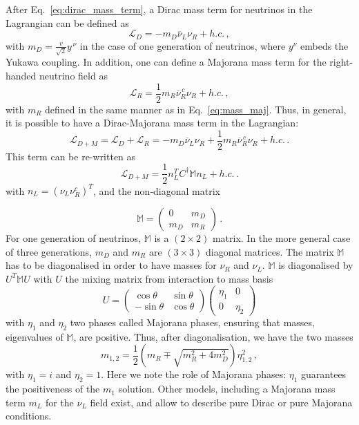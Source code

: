 After Eq.~\eqref{eq:dirac_mass_term}, a Dirac mass term for neutrinos in the Lagrangian can be defined as
\begin{equation}
  \mathcal{L}_D=-m_D\overline{\nu}_L\nu_R+h.c.\,,
  \label{eq:lag_dirac}
\end{equation}
with $m_D=\frac{v}{\sqrt{2}}y^{\,\nu}$ in the case of one generation of neutrinos, where $y^{\nu}$ embeds the Yukawa coupling.
In addition, one can define a Majorana mass term for the right-handed neutrino field as
\begin{equation}
  \mathcal{L}_R=\frac{1}{2}m_R\overline{\nu}_{R}^{\,c}\nu_{R}+h.c.\,,
\end{equation}
with $m_R$ defined in the same manner as in Eq.~\eqref{eq:mass_maj}.
Thus, in general, it is possible to have a Dirac-Majorana mass term in the Lagrangian:
\begin{equation}
\mathcal{L}_{D+M}=\mathcal{L}_D+\mathcal{L}_R=-m_{D}\overline{\nu}_L\nu_R+\frac{1}{2}m_R\overline{\nu}_{R}^{\,c}\nu_{R}+h.c.\,.
\end{equation}
This term can be re-written as
\begin{equation}
  \mathcal{L}_{D+M}=\frac{1}{2}n_L^TC^{\dagger}\mathbb{M}n_L+h.c.\,.
\end{equation}
with $n_L=(\nu_L \nu_R^{c})^{T}$, and the non-diagonal matrix

\begin{equation}
\mathbb{M}=
\begin{pmatrix}
  0 & m_D \\
  m_D & m_{R}
\end{pmatrix}
\,.
\end{equation}
For one generation of neutrinos, $\mathbb{M}$ is a $(2\times 2)$ matrix.
In the more general case of three generations, $m_D$ and $m_R$ are $(3 \times 3)$ diagonal matrices.
The matrix $\mathbb{M}$ has to be diagonalised in order to have masses for $\nu_R$ and $\nu_L$.
$\mathbb{M}$ is diagonalised by $U^T\mathbb{M}U$ with $U$ the mixing matrix from interaction to mass basis
\begin{equation}
  U =
\begin{pmatrix}
  \cos{\theta} & \sin{\theta} \\
  -\sin{\theta} & \cos{\theta}
\end{pmatrix}
\begin{pmatrix}
  \eta_{1} & 0 \\
  0 & \eta_{2}
\end{pmatrix}
\end{equation}
with $\eta_{1}$ and $\eta_{2}$ two phases called Majorana phases, ensuring that masses, eigenvalues of $\mathbb{M}$, are positive.
Thus, after diagonalisation, we have the two masses
\begin{equation}
m_{1,2}=\frac{1}{2}\left(m_R\mp\sqrt{m_R^{2}+4m_{D}^{2}}\right)\eta^{2}_{1,2}\,,
\end{equation}
with $\eta_{1}=i$ and $\eta_{2}=1$.
Here we note the role of Majorana phases: $\eta_{1}$ guarantees the positiveness of the $m_{1}$ solution.
Other models, including a Majorana mass term $m_L$ for the $\nu_L$ field exist, and allow to describe pure Dirac or pure Majorana conditions.


